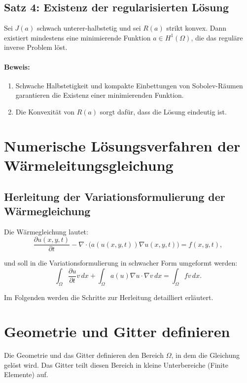 \subsection*{Satz 4: Existenz der regularisierten Lösung}

Sei $J(a)$ schwach unterer-halbstetig und sei $R(a)$ strikt konvex. Dann existiert mindestens eine minimierende Funktion $a \in H^1(\Omega)$, die das reguläre inverse Problem löst.

\paragraph{Beweis:}
\begin{enumerate}
	\item Schwache Halbstetigkeit und kompakte Einbettungen von Sobolev-Räumen garantieren die Existenz einer minimierenden Funktion.
	\item Die Konvexität von $R(a)$ sorgt dafür, dass die Lösung eindeutig ist.
\end{enumerate} 


\section{Numerische Lösungsverfahren der Wärmeleitungsgleichung}

\subsection{Herleitung der Variationsformulierung der Wärmegleichung}

Die Wärmegleichung lautet:
\begin{equation}
	\frac{\partial u(x, y, t)}{\partial t} - \nabla \cdot \big(a(u(x, y, t)) \nabla u(x, y, t)\big) = f(x, y, t),
\end{equation}

und soll in die Variationsformulierung in schwacher Form umgeformt werden:
\begin{equation}
	\int_\Omega \frac{\partial u}{\partial t} v \, dx + \int_\Omega a(u) \nabla u \cdot \nabla v \, dx = \int_\Omega f v \, dx.
\end{equation}

Im Folgenden werden die Schritte zur Herleitung detailliert erläutert.

\section{Geometrie und Gitter definieren}
Die Geometrie und das Gitter definieren den Bereich $\Omega$, in dem die Gleichung gelöst wird. Das Gitter teilt diesen Bereich in kleine Unterbereiche (Finite Elemente) auf.

